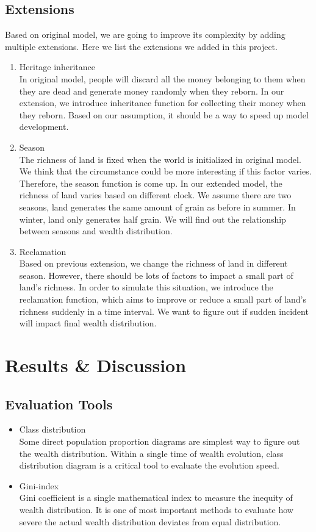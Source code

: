 \subsection{Extensions}
Based on original model, we are going to improve its complexity by adding multiple extensions. Here we list the extensions we added in this project. 
\begin{enumerate}
	\item Heritage inheritance\\
	In original model, people will discard all the money belonging to them when they are dead and generate money randomly when they reborn. In our extension, we introduce inheritance function for collecting their money when they reborn. Based on our assumption, it should be a way to speed up model development. 
	\item Season\\
	The richness of land is fixed when the world is initialized in original model. We think that the circumstance could be more interesting if this factor varies. Therefore, the season function is come up. In our extended model, the richness of land varies based on different clock. We assume there are two seasons, land generates the same amount of grain as before in summer. In winter, land only generates half grain. We will find out the relationship between seasons and wealth distribution.
	\item Reclamation\\
	Based on previous extension, we change the richness of land in different season. However, there should be lots of factors to impact a small part of land's richness. In order to simulate this situation, we introduce the reclamation function, which aims to improve or reduce a small part of land's richness suddenly in a time interval. We want to figure out if sudden incident will impact final wealth distribution.
\end{enumerate}
\section{Results \& Discussion}
\subsection{Evaluation Tools}
\begin{itemize}
	\item Class distribution\\
	Some direct population proportion diagrams are simplest way to figure out the wealth distribution. Within a single time of wealth evolution, class distribution diagram is a critical tool to evaluate the evolution speed. 
	\item Gini-index\\
	Gini coefficient is a single mathematical index to measure the inequity of wealth distribution. It is one of most important methods to evaluate how severe the actual wealth distribution deviates from equal distribution.
\end{itemize}
